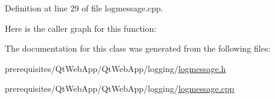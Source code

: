 Definition at line 29 of file logmessage.\+cpp.

Here is the caller graph for this function\+:


The documentation for this class was generated from the following files\+:\begin{DoxyCompactItemize}
\item 
prerequisites/\+Qt\+Web\+App/\+Qt\+Web\+App/logging/\mbox{\hyperlink{logmessage_8h}{logmessage.\+h}}\item 
prerequisites/\+Qt\+Web\+App/\+Qt\+Web\+App/logging/\mbox{\hyperlink{logmessage_8cpp}{logmessage.\+cpp}}\end{DoxyCompactItemize}
